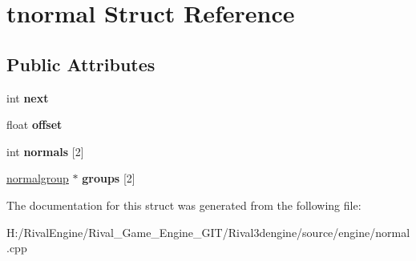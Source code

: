 \hypertarget{structtnormal}{}\section{tnormal Struct Reference}
\label{structtnormal}
\subsection*{Public Attributes}
\begin{DoxyCompactItemize}
\item 
\mbox{\label{structtnormal_af8d01e8ed3e724040d83a5f3198157ce}} 
int {\bfseries next}
\item 
\mbox{\label{structtnormal_aded5611ac3cbb80d734d40a83a30ad36}} 
float {\bfseries offset}
\item 
\mbox{\label{structtnormal_a50eb705481497388a81378be622800ad}} 
int {\bfseries normals} \mbox{[}2\mbox{]}
\item 
\mbox{\label{structtnormal_a234a0a45bce43c17d6841ad7ec3df392}} 
\hyperlink{structnormalgroup}{normalgroup} $\ast$ {\bfseries groups} \mbox{[}2\mbox{]}
\end{DoxyCompactItemize}


The documentation for this struct was generated from the following file\+:\begin{DoxyCompactItemize}
\item 
H\+:/\+Rival\+Engine/\+Rival\+\_\+\+Game\+\_\+\+Engine\+\_\+\+G\+I\+T/\+Rival3dengine/source/engine/normal.\+cpp\end{DoxyCompactItemize}
